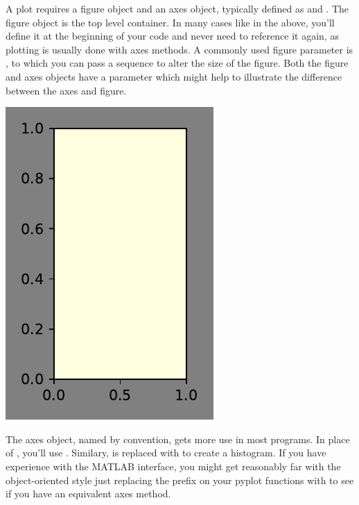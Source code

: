 A plot requires a figure object and an axes object, typically defined as  and . The figure object is the top level container. In many cases like in the above, you'll define it at the beginning of your code and never need to reference it again, as plotting is usually done with axes methods. A commonly used figure parameter is , to which you can pass a sequence to alter the size of the figure. Both the figure and axes objects have a  parameter which might help to illustrate the difference between the axes and figure. 



\begin{center}
    \includegraphics[width = .45\textwidth]{figures/proseplots/figparams.pdf}
\end{center}


The axes object, named  by convention, gets more use in most programs. In place of , you'll use . Similary,  is replaced with  to create a histogram. If you have experience with the MATLAB interface, you might get reasonably far with the object-oriented style just replacing the  prefix on your pyplot functions with  to see if you have an equivalent axes method.

